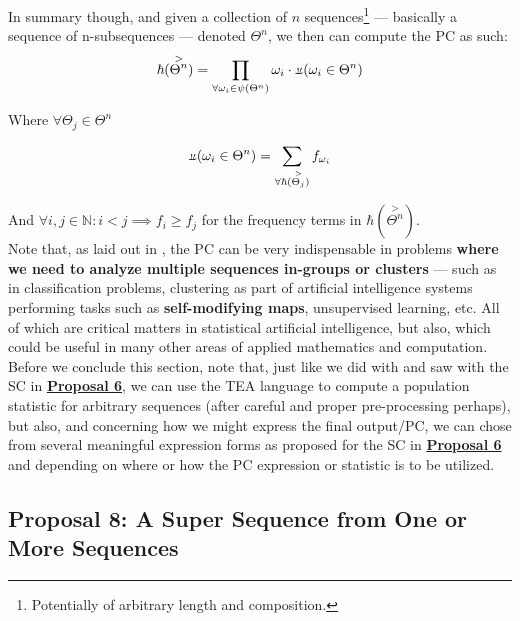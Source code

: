 \documentclass[12pt,a4paper]{article}
\newcommand{\invpi}[1]{\mathop{\rotatebox[origin=c]{180}{$\pi$}}#1}
\begin{document}
In summary though, and given a collection of $n$ sequences\footnote{Potentially of arbitrary length and composition.} --- basically a sequence of n-subsequences --- denoted $\Theta^n$, we then can compute the PC as such:\\


\begin{equation}
\label{EQPOPCHAR}
\hbar(\overset{>}{\Theta^n}) = \prod\limits_{\forall \omega_i \in \psi(\Theta^n)} \omega_i \cdot \invpi(\omega_i \in \Theta^n)
\end{equation}

Where $\forall \Theta_j \in \Theta^n$

\begin{equation}
\invpi(\omega_i \in \Theta^n) = \sum\limits_{\forall \hbar(\overset{>}{\Theta_j})} f_{\omega_i}
\end{equation}

And $\forall i, j \in \mathbb{N}: i < j \implies f_i \geq f_j$ for the frequency terms in $\hbar(\overset{>}{\Theta^n})$.\\


Note that, as laid out in \cite{lutalo_2025_trans_genetics}, the PC can be very indispensable in problems \textbf{where we need to analyze multiple sequences in-groups or clusters} --- such as in classification problems, clustering as part of artificial intelligence systems performing tasks such as \textbf{self-modifying maps}, unsupervised learning, etc. All of which are critical matters in statistical artificial intelligence, but also, which could be useful in many other areas of applied mathematics and computation.\\

Before we conclude this section, note that, just like we did with and saw with the SC in \textbf{\hyperref[PROP6]{Proposal 6}}, we can use the TEA language to compute a population statistic for arbitrary sequences (after careful and proper pre-processing perhaps), but also, and concerning how we might express the final output/PC, we can chose from several meaningful expression forms as proposed for the SC in \textbf{\hyperref[PROP6]{Proposal 6}} and depending on where or how the PC expression or statistic is to be utilized.

\subsection{Proposal 8: A Super Sequence from One or More Sequences\cite{lutalo_2025_trans_genetics}}
\label{PROP8}
\end{document}
